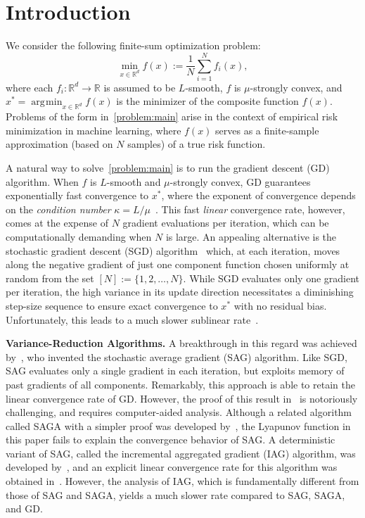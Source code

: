 \documentclass{article}
\theoremstyle{plain}
\theoremstyle{definition}
\newcommand{\R}{\mathbb{R}}
\DeclareMathOperator*{\argmin}{\arg\!\min}
\begin{document}
\section{Introduction}
\label{sec:Intro}
We consider the following finite-sum optimization problem: 
\vspace{-3mm}
\begin{equation}
    \min_{x\in\R^d} f(x):= \frac{1}{N}\sum_{i=1}^N f_i(x), \label{problem:main}
\end{equation}
where each $f_i: \mathbb{R}^d \to \mathbb{R}$ is assumed to be $L$-smooth, $f$ is $\mu$-strongly convex, and $x^* = \argmin_{x \in \mathbb{R}^d} f(x)$ is the minimizer of the composite function $f(x)$. Problems of the form in~\eqref{problem:main} arise in the context of empirical risk minimization in machine learning, where $f(x)$ serves as a 
finite-sample approximation (based on $N$ samples) of a true risk function. 

A natural way to solve~\eqref{problem:main} is to run the gradient descent (GD) algorithm. When $f$ is $L$-smooth and $\mu$-strongly convex, GD guarantees exponentially fast convergence to $x^*$, where the exponent of convergence depends on the \emph{condition number} $\kappa=L/\mu$~\cite{bubeck2015convex}. This fast \emph{linear} convergence rate, however, comes at the expense of $N$ gradient evaluations per iteration, which can be computationally demanding when $N$ is large. An appealing alternative is the stochastic gradient descent (SGD) algorithm~\cite{robbins1951stochastic} which, at each iteration, moves along the negative gradient of just one component function chosen uniformly at random from the set $[N]:=\{1, 2, \ldots, N\}.$ While SGD evaluates only one gradient per iteration, the high variance in its update direction necessitates a diminishing step-size sequence to ensure exact convergence to $x^*$ with no residual bias. Unfortunately, this leads to a much slower sublinear rate~\cite{moulines2011non}.  

\textbf{Variance-Reduction Algorithms.} A breakthrough in this regard was achieved by~\citet{SAG}, who invented the stochastic average gradient (SAG) algorithm. Like SGD, SAG evaluates only a single gradient in each iteration, but exploits memory of past gradients of all components. Remarkably, this approach is able to retain the linear convergence rate of GD. However, the proof of this result in~\citet{SAG_proof} is notoriously challenging, and requires computer-aided analysis. Although a related algorithm called SAGA with a simpler proof was developed by~\citet{SAGA}, the Lyapunov function in this paper fails to explain the convergence behavior of SAG. A deterministic variant of SAG, called the incremental aggregated gradient (IAG) algorithm, was developed by~\citet{blatt2007convergent}, and an explicit linear convergence rate for this algorithm was obtained in~\citet{gurbuzbalaban2017convergence}. However, the analysis of IAG, which is fundamentally different from those of SAG and SAGA, yields a much slower rate compared to SAG, SAGA, and GD. 
\end{document}
